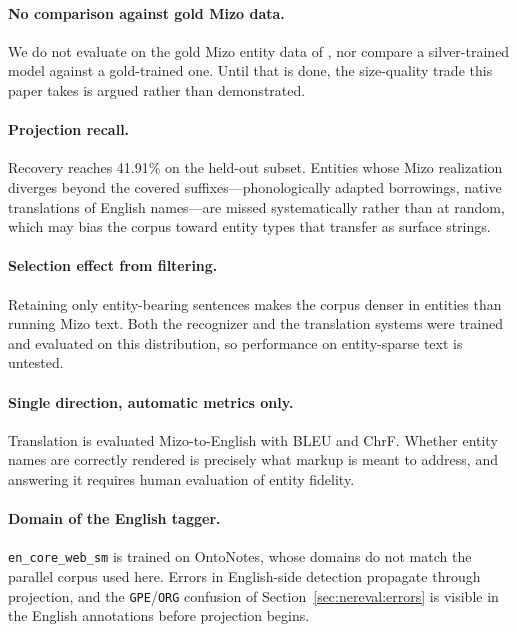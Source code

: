 \documentclass[acmsmall,screen,review]{acmart}
\begin{document}
\paragraph{No comparison against gold Mizo data.}
We do not evaluate on the gold Mizo entity data of \citet{ghosh2025mizokhasi},
nor compare a silver-trained model against a gold-trained one. Until that is
done, the size-quality trade this paper takes is argued rather than demonstrated.

\paragraph{Projection recall.}
Recovery reaches 41.91\% on the held-out subset. Entities whose Mizo realization
diverges beyond the covered suffixes---phonologically adapted borrowings, native
translations of English names---are missed systematically rather than at random,
which may bias the corpus toward entity types that transfer as surface strings.

\paragraph{Selection effect from filtering.}
Retaining only entity-bearing sentences makes the corpus denser in entities than
running Mizo text. Both the recognizer and the translation systems were trained
and evaluated on this distribution, so performance on entity-sparse text is
untested.

\paragraph{Single direction, automatic metrics only.}
Translation is evaluated Mizo-to-English with BLEU and ChrF. Whether entity
names are correctly rendered is precisely what markup is meant to address, and
answering it requires human evaluation of entity fidelity.

\paragraph{Domain of the English tagger.}
\texttt{en\_core\_web\_sm} is trained on OntoNotes, whose domains do not match
the parallel corpus used here. Errors in English-side detection propagate
through projection, and the \texttt{GPE}/\texttt{ORG} confusion of
Section~\ref{sec:nereval:errors} is visible in the English annotations before
projection begins.

\end{document}

